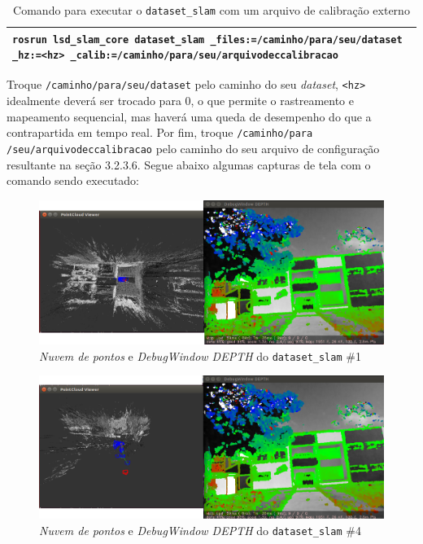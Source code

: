 \begin{table}[H]\label{tb:16}
\begin{tabular}{| p{\textwidth}|}
\hline
\texttt{rosrun lsd\_slam\_core dataset\_slam \_files:=/caminho/para/seu/dataset \_hz:=<hz> \_calib:=/caminho/para/seu/arquivodeccalibracao}\\
\hline
\end{tabular}
\caption{Comando para executar o \texttt{dataset\_slam} com um arquivo de calibração externo}
\end{table}

Troque \texttt{/caminho/para/seu/dataset} pelo caminho do seu \textit{dataset}, \texttt{<hz>} idealmente deverá ser trocado para 0, o que permite o rastreamento e mapeamento sequencial, mas haverá uma queda de desempenho do que a contrapartida em tempo real. Por fim, troque \texttt{/caminho/para}\\ \texttt{/seu/arquivodeccalibracao} pelo caminho do seu arquivo de configuração resultante na seção 3.2.3.6. Segue abaixo algumas capturas de tela com o comando sendo executado:

\begin{figure}[H]
	\centering
		\includegraphics[width= \textwidth]{Imagens/figura3-26E3-27.png}
	\caption{\textit{Nuvem de pontos} e \textit{DebugWindow DEPTH} do \texttt{dataset\_slam} \#1}
	\label{fig3:26}
\end{figure}





\begin{figure}[H]
	\centering
		\includegraphics[width= \textwidth]{Imagens/figura3-28E3-29.png}
	\caption{\textit{Nuvem de pontos} e \textit{DebugWindow DEPTH} do \texttt{dataset\_slam} \#4}
	\label{fig3:27}
\end{figure}

